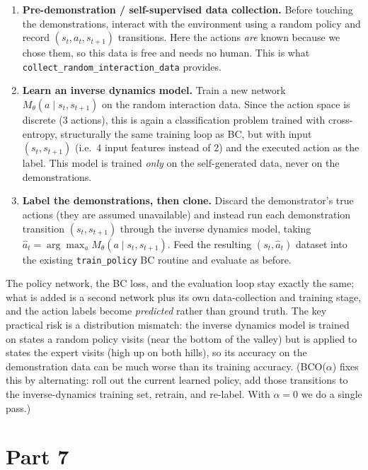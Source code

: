 \documentclass[12pt]{article}%
\begin{document}
\begin{enumerate}
  \item \textbf{Pre-demonstration / self-supervised data collection.} Before touching the
        demonstrations, interact with the environment using a random policy and record
        $(s_t, a_t, s_{t+1})$ transitions. Here the actions \emph{are} known because we
        chose them, so this data is free and needs no human. This is what
        \texttt{collect\_random\_interaction\_data} provides.

  \item \textbf{Learn an inverse dynamics model.} Train a new network
        $M_\theta(a \mid s_t, s_{t+1})$ on the random interaction data. Since the action
        space is discrete (3 actions), this is again a classification problem trained with
        cross-entropy, structurally the same training loop as BC, but with input
        $(s_t, s_{t+1})$ (i.e.\ 4 input features instead of 2) and the executed action as
        the label. This model is trained \emph{only} on the self-generated data, never on
        the demonstrations.

  \item \textbf{Label the demonstrations, then clone.} Discard the demonstrator's true
        actions (they are assumed unavailable) and instead run each demonstration
        transition $(s_t, s_{t+1})$ through the inverse dynamics model, taking
        $\hat a_t = \arg\max_a M_\theta(a \mid s_t, s_{t+1})$. Feed the resulting
        $(s_t, \hat a_t)$ dataset into the existing \texttt{train\_policy} BC routine and
        evaluate as before.
\end{enumerate}

The policy network, the BC loss, and the evaluation loop stay exactly the same; what is
added is a second network plus its own data-collection and training stage, and the action
labels become \emph{predicted} rather than ground truth. The key practical risk is a
distribution mismatch: the inverse dynamics model is trained on states a random policy
visits (near the bottom of the valley) but is applied to states the expert visits (high up
on both hills), so its accuracy on the demonstration data can be much worse than its
training accuracy. (BCO($\alpha$) fixes this by alternating: roll out the current learned
policy, add those transitions to the inverse-dynamics training set, retrain, and re-label.
With $\alpha = 0$ we do a single pass.)




\section{Part 7}
\end{document}
